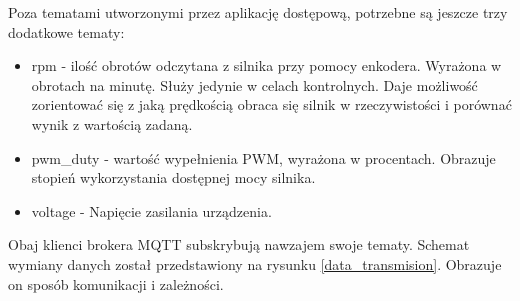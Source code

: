         \vspace{1em} 
        Poza tematami utworzonymi przez aplikację dostępową, potrzebne są jeszcze trzy dodatkowe tematy:
    
        \begin{itemize}
          \item rpm - ilość obrotów odczytana z silnika przy pomocy enkodera. Wyrażona w obrotach na minutę. Służy jedynie w celach kontrolnych. Daje możliwość zorientować się z jaką prędkością obraca się silnik w rzeczywistości i porównać wynik z wartością zadaną.
          
          \item pwm\_duty - wartość wypełnienia PWM, wyrażona w procentach. Obrazuje stopień wykorzystania dostępnej mocy silnika.
          
          \item voltage - Napięcie zasilania urządzenia. 
          
        \end{itemize}
        
        Obaj klienci brokera MQTT subskrybują nawzajem swoje tematy. Schemat wymiany danych został przedstawiony na rysunku \ref{data_transmision}. Obrazuje on sposób komunikacji i zależności.
        
